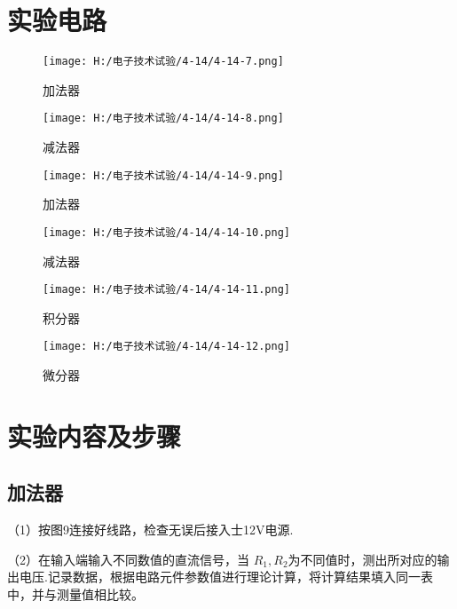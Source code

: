 \documentclass{article}
\begin{document}
\section{ 实验电路}
\begin{figure}[h]
	\begin{minipage}[t]{0.5\linewidth} %
	  \centering   
	  \texttt{[image: H:/电子技术试验/4-14/4-14-7.png]}   
	  \caption{加法器}   
	  \label{fig:side:a}   
	\end{minipage}%
	\begin{minipage}[t]{0.5\linewidth}   
	  \centering   
	  \texttt{[image: H:/电子技术试验/4-14/4-14-8.png]}   
	  \caption{减法器}   
	  \label{fig:side:b}   
	\end{minipage}   
  \end{figure}
\begin{figure}[h]
	\begin{minipage}[t]{0.5\linewidth} %
	  \centering   
	  \texttt{[image: H:/电子技术试验/4-14/4-14-9.png]}   
	  \caption{加法器}   
	  \label{fig:side:a}   
	\end{minipage}%
	\begin{minipage}[t]{0.5\linewidth}   
	  \centering   
	  \texttt{[image: H:/电子技术试验/4-14/4-14-10.png]}   
	  \caption{减法器}   
	  \label{fig:side:b}   
	\end{minipage}   
  \end{figure}
  \begin{figure}[h]
	\begin{minipage}[t]{0.5\linewidth} %
	  \centering   
	  \texttt{[image: H:/电子技术试验/4-14/4-14-11.png]}   
	  \caption{积分器}   
	  \label{fig:side:a}   
	\end{minipage}%
	\begin{minipage}[t]{0.5\linewidth}   
	  \centering   
	  \texttt{[image: H:/电子技术试验/4-14/4-14-12.png]}   
	  \caption{微分器}   
	  \label{fig:side:b}   
	\end{minipage}   
  \end{figure}

\section{ 实验内容及步骤}
  \subsection{加法器}
  （1）按图9连接好线路，检查无误后接入士12V电源.\par
  （2）在输入端输入不同数值的直流信号，当 $R_1,R_2$为不同值时，测出所对应的输出电压.记录数据，根据电路元件参数值进行理论计算，将计算结果填入同一表中，并与测量值相比较。
  \par
\end{document}
